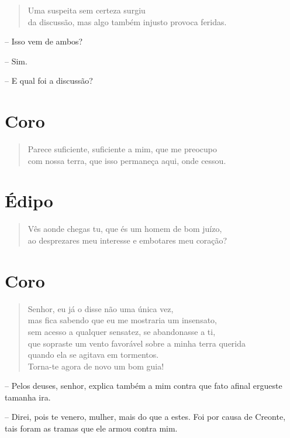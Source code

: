 \begin{verse}Uma suspeita sem certeza surgiu\\
da discussão, mas algo também injusto provoca feridas.
\end{verse}

 --   Isso vem de ambos?

 --   Sim.

 --   E qual foi a discussão?


\section{Coro} 

\begin{verse}Parece suficiente, suficiente a mim, que me preocupo\\
com nossa terra, que isso permaneça aqui, onde cessou.
\end{verse}

\section{Édipo} 

\begin{verse}Vês aonde chegas tu, que és um homem de bom juízo,\\
ao desprezares meu interesse e embotares meu coração?
\end{verse}


\section{Coro} 

\begin{verse}Senhor, eu já o disse não uma única vez, \\
mas fica sabendo que eu me mostraria um insensato,\\
sem acesso a qualquer sensatez, se abandonasse a ti,\\
que sopraste um vento favorável sobre a minha terra querida\\
quando ela se agitava em tormentos.\\
Torna-te agora de novo um bom guia!
\end{verse}

 --   Pelos deuses, senhor, explica também a mim contra que fato afinal
ergueste tamanha ira.

 --    Direi, pois te venero, mulher, mais do que a estes. Foi por causa
de Creonte, tais foram as tramas que ele armou contra mim.

